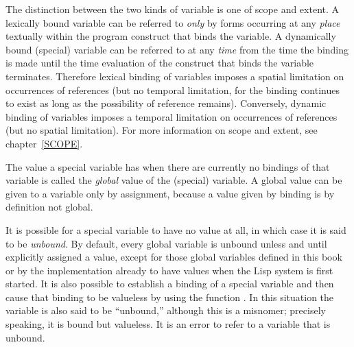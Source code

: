 The distinction between the two kinds of variable is one of scope
and extent.  A lexically bound variable can be referred to \emph{only}
by forms occurring at any \emph{place} textually within the program construct that
binds the variable.  A dynamically bound (special) variable can
be referred to at any \emph{time} from the time the binding is made
until the time evaluation of the construct that binds the variable
terminates.  Therefore lexical binding of variables
imposes a spatial limitation
on occurrences of references (but no temporal limitation, for the
binding continues to exist as long as the possibility of reference
remains).  Conversely, dynamic binding of variables imposes a temporal
limitation on occurrences of references (but no spatial limitation).
For more information on scope and extent, see chapter~\ref{SCOPE}.

The value a special variable has when there are currently
no bindings of that variable is called the \emph{global} value of the
(special) variable.
A global value can be given to a variable only by assignment,
because a value given by binding is by definition not global.

It is possible for a special variable to have no value at all,
in which case it is said to be \emph{unbound}.
By default, every global variable is unbound unless and until
explicitly assigned a value, except for those global variables
defined in this book or by the implementation already to have values
when the Lisp system is first started.
It is also possible to establish a binding of a special variable
and then cause that binding to be valueless by using the
function .  In this situation the variable
is also said to be ``unbound,'' although this is a misnomer;
precisely speaking, it is bound but valueless.
It is an error to refer to a variable that is unbound.

